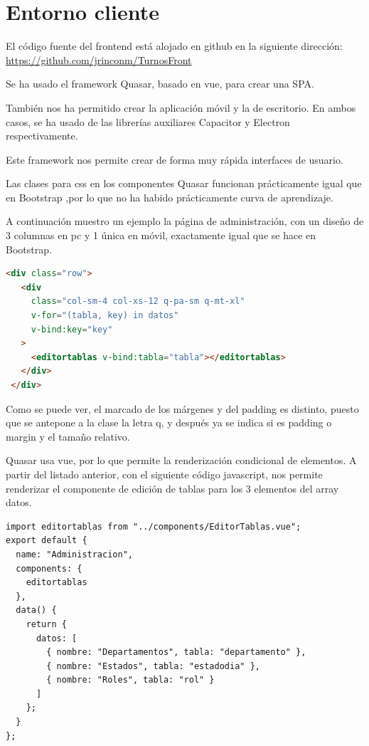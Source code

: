 \documentclass[11pt,spanish,listoffigures,listoftables]{tfgetsinf}
\begin{document}
\section{Entorno cliente}
El código fuente del frontend está alojado en github en la siguiente dirección: \\
\url{https://github.com/jrinconm/TurnosFront}

Se ha usado el framework Quasar, basado en vue, para crear una SPA. 

También nos ha permitido crear la aplicación móvil y la de escritorio. En ambos casos, se ha usado de las librerías auxiliares Capacitor y Electron respectivamente.

Este framework nos permite crear de forma muy rápida interfaces de usuario. 

Las clases para css en los componentes Quasar funcionan prácticamente igual que en Bootstrap ,por lo que no ha habido prácticamente curva de aprendizaje.

A continuación muestro un ejemplo la página de administración, con un diseño de 3 columnas en pc y 1 única en móvil, exactamente igual que se hace en Bootstrap.

\begin{lstlisting}[language=HTML, caption={Template página administración}]
   <div class="row">
   <div
     class="col-sm-4 col-xs-12 q-pa-sm q-mt-xl"
     v-for="(tabla, key) in datos"
     v-bind:key="key"
   >
     <editortablas v-bind:tabla="tabla"></editortablas>
   </div>
 </div>
\end{lstlisting}

Como se puede ver, el marcado de los márgenes y del padding es distinto, puesto que se antepone a la clase la letra q, y después ya se indica si es padding o margin y el tamaño relativo.

Quasar usa vue, por lo que permite la renderización condicional de elementos. A partir del listado anterior, con el siguiente código javascript, nos permite renderizar el componente de edición de tablas para los 3 elementos del array datos.

\begin{lstlisting}[style=ES6, caption={Script página administracón}]
import editortablas from "../components/EditorTablas.vue";
export default {
  name: "Administracion",
  components: {
    editortablas
  },
  data() {
    return {
      datos: [
        { nombre: "Departamentos", tabla: "departamento" },
        { nombre: "Estados", tabla: "estadodia" },
        { nombre: "Roles", tabla: "rol" }
      ]
    };
  }
};
\end{lstlisting}
\end{document}
